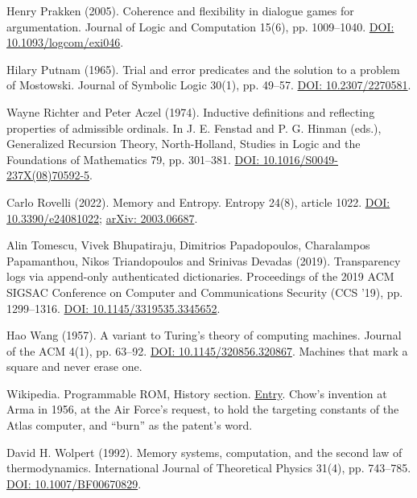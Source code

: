 \documentclass[11pt,twoside]{article}
\theoremstyle{thielethm}
\theoremstyle{thieledef}
\theoremstyle{thieledef}
\theoremstyle{thieledef}
\theoremstyle{thielethm}
\theoremstyle{thieleobs}
\theoremstyle{thielethm}
\begin{document}
\noindent Henry Prakken (2005). Coherence and flexibility in dialogue games for argumentation. Journal of Logic and Computation 15(6), pp. 1009--1040. \href{https://doi.org/10.1093/logcom/exi046}{DOI: 10.1093/logcom/exi046}.
\par\medskip

\noindent Hilary Putnam (1965). Trial and error predicates and the solution to a problem of Mostowski. Journal of Symbolic Logic 30(1), pp. 49--57. \href{https://doi.org/10.2307/2270581}{DOI: 10.2307/2270581}.
\par\medskip

\noindent Wayne Richter and Peter Aczel (1974). Inductive definitions and reflecting properties of admissible ordinals. In J. E. Fenstad and P. G. Hinman (eds.), Generalized Recursion Theory, North-Holland, Studies in Logic and the Foundations of Mathematics 79, pp. 301--381. \href{https://doi.org/10.1016/S0049-237X(08)70592-5}{DOI: 10.1016/S0049-237X(08)70592-5}.
\par\medskip

\noindent Carlo Rovelli (2022). Memory and Entropy. Entropy 24(8), article 1022. \href{https://doi.org/10.3390/e24081022}{DOI: 10.3390/e24081022}; \href{https://arxiv.org/abs/2003.06687}{arXiv: 2003.06687}.
\par\medskip

\noindent Alin Tomescu, Vivek Bhupatiraju, Dimitrios Papadopoulos, Charalampos Papamanthou, Nikos Triandopoulos and Srinivas Devadas (2019). Transparency logs via append-only authenticated dictionaries. Proceedings of the 2019 ACM SIGSAC Conference on Computer and Communications Security (CCS '19), pp. 1299--1316. \href{https://doi.org/10.1145/3319535.3345652}{DOI: 10.1145/3319535.3345652}.
\par\medskip

\noindent Hao Wang (1957). A variant to Turing's theory of computing machines. Journal of the ACM 4(1), pp. 63--92. \href{https://doi.org/10.1145/320856.320867}{DOI: 10.1145/320856.320867}. Machines that mark a square and never erase one.
\par\medskip

\noindent Wikipedia. Programmable ROM, History section. \href{https://en.wikipedia.org/wiki/Programmable_ROM}{Entry}. Chow's invention at Arma in 1956, at the Air Force's request, to hold the targeting constants of the Atlas computer, and ``burn'' as the patent's word.
\par\medskip

\noindent David H. Wolpert (1992). Memory systems, computation, and the second law of thermodynamics. International Journal of Theoretical Physics 31(4), pp. 743--785. \href{https://doi.org/10.1007/BF00670829}{DOI: 10.1007/BF00670829}.
\par\medskip
\end{document}
